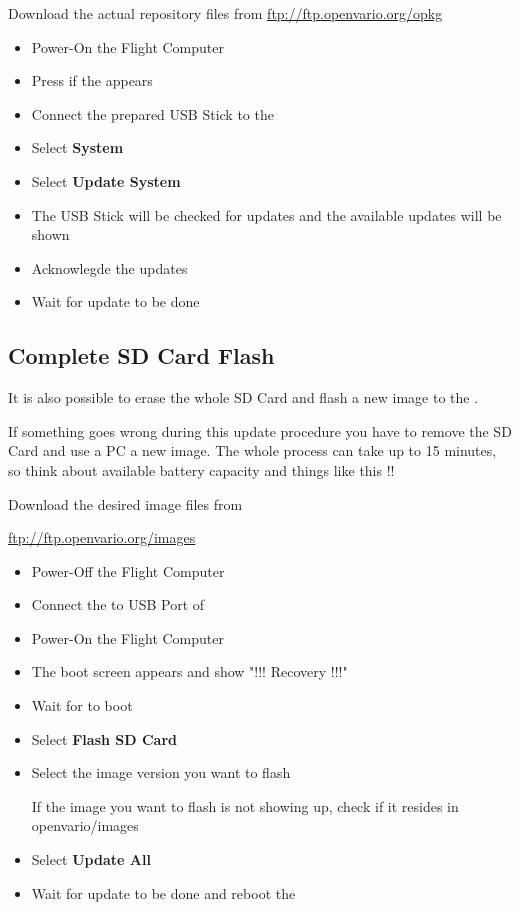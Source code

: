 Download the actual repository files from 
\url{ftp://ftp.openvario.org/opkg}


\begin{itemize}
	\item Power-On the Flight Computer
	\item Press  if the \ovmenu appears
	\item Connect the prepared USB Stick to the \ovfc
	\item Select \textbf{System}
	\item Select \textbf{Update System}
	\item The USB Stick will be checked for updates and the available updates will be shown
	\item Acknowlegde the updates
	\item Wait for update to be done
\end{itemize}

\subsection{Complete SD Card Flash}\label{cha:sdcard_flash}
It is also possible to erase the whole SD Card and flash a new image to the \ovfc.

\warning If something goes wrong during this update procedure you have to remove the SD Card and use a PC a new image.
The whole process can take up to 15 minutes, so think about available battery capacity and things like this !!

Download the desired image files from 

\url{ftp://ftp.openvario.org/images}


\begin{itemize}
	\item Power-Off the Flight Computer
	\item Connect the \ovusb to USB Port of \ovfc
	\item Power-On the Flight Computer
	\item The boot screen appears and show "!!! Recovery !!!"
	\item Wait for \ovfc to boot
	\item Select \textbf{Flash SD Card}
	\item Select the image version you want to flash
	
	\tip If the image you want to flash is not showing up, check if it resides in openvario/images
	
	\item Select \textbf{Update All}
	\item Wait for update to be done and reboot the \ovfc
\end{itemize}



